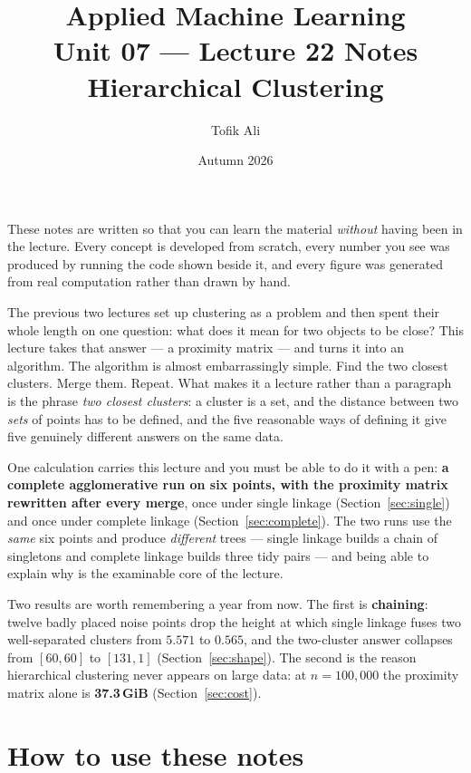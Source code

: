 \documentclass[11pt]{article}
\title{Applied Machine Learning\\Unit 07 --- Lecture 22 Notes\\
       Hierarchical Clustering}
\author{Tofik Ali}
\date{Autumn 2026}
\begin{document}
\maketitle

\begin{keyidea}
These notes are written so that you can learn the material \emph{without}
having been in the lecture. Every concept is developed from scratch, every
number you see was produced by running the code shown beside it, and every
figure was generated from real computation rather than drawn by hand.

The previous two lectures set up clustering as a problem and then spent their
whole length on one question: what does it mean for two objects to be close?
This lecture takes that answer --- a proximity matrix --- and turns it into an
algorithm. The algorithm is almost embarrassingly simple. Find the two closest
clusters. Merge them. Repeat. What makes it a lecture rather than a paragraph
is the phrase \emph{two closest clusters}: a cluster is a set, and the distance
between two \emph{sets} of points has to be defined, and the five reasonable
ways of defining it give five genuinely different answers on the same data.

One calculation carries this lecture and you must be able to do it with a pen:
\textbf{a complete agglomerative run on six points, with the proximity matrix
rewritten after every merge}, once under single linkage
(Section~\ref{sec:single}) and once under complete linkage
(Section~\ref{sec:complete}). The two runs use the \emph{same} six points and
produce \emph{different} trees --- single linkage builds a chain of singletons
and complete linkage builds three tidy pairs --- and being able to explain why
is the examinable core of the lecture.

Two results are worth remembering a year from now. The first is
\textbf{chaining}: twelve badly placed noise points drop the height at which
single linkage fuses two well-separated clusters from $5.571$ to $0.565$, and
the two-cluster answer collapses from $[60, 60]$ to $[131, 1]$
(Section~\ref{sec:shape}). The second is the reason hierarchical clustering
never appears on large data: at $n = 100{,}000$ the proximity matrix alone is
\textbf{37.3\,GiB} (Section~\ref{sec:cost}).
\end{keyidea}

\tableofcontents
\medskip

\section{How to use these notes}
\label{sec:how}
\end{document}
